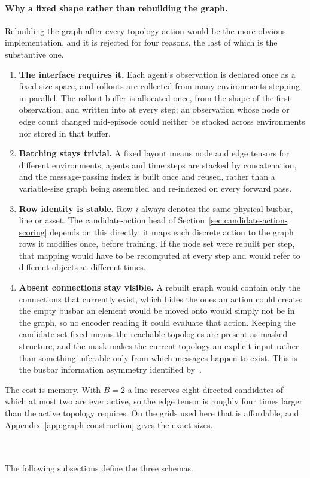 {\color{clarif}
\paragraph{Why a fixed shape rather than rebuilding the graph.}
Rebuilding the graph after every topology action would be the more obvious
implementation, and it is rejected for four reasons, the last of which is the
substantive one.
\begin{enumerate}
  \item \textbf{The interface requires it.} Each agent's observation is declared
  once as a fixed-size space, and rollouts are collected from many environments
  stepping in parallel. The rollout buffer is allocated once, from the shape of
  the first observation, and written into at every step; an observation whose
  node or edge count changed mid-episode could neither be stacked across
  environments nor stored in that buffer.
  \item \textbf{Batching stays trivial.} A fixed layout means node and edge
  tensors for different environments, agents and time steps are stacked by
  concatenation, and the message-passing index is built once and reused, rather
  than a variable-size graph being assembled and re-indexed on every forward
  pass.
  \item \textbf{Row identity is stable.} Row $i$ always denotes the same
  physical busbar, line or asset. The candidate-action head of
  Section~\ref{sec:candidate-action-scoring} depends on this directly: it maps
  each discrete action to the graph rows it modifies once, before training. If
  the node set were rebuilt per step, that mapping would have to be recomputed
  at every step and would refer to different objects at different times.
  \item \textbf{Absent connections stay visible.} A rebuilt graph would contain
  only the connections that currently exist, which hides the ones an action
  could create: the empty busbar an element would be moved onto would simply not
  be in the graph, so no encoder reading it could evaluate that action. Keeping
  the candidate set fixed means the reachable topologies are present as masked
  structure, and the mask makes the current topology an explicit input rather
  than something inferable only from which messages happen to exist. This is the
  busbar information asymmetry identified by~\textcite{dejong2025gnntopo}.
\end{enumerate}
The cost is memory. With $B=2$ a line reserves eight directed candidates of
which at most two are ever active, so the edge tensor is roughly four times
larger than the active topology requires. On the grids used here that is
affordable, and Appendix~\ref{app:graph-construction} gives the exact sizes.
}
\\
\\
The following subsections define the three schemas.


